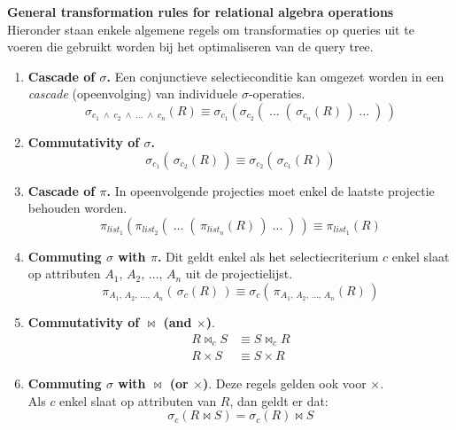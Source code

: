 \noindent \textbf{General transformation rules for relational algebra operations}\\
Hieronder staan enkele algemene regels om transformaties op queries uit te voeren die gebruikt worden bij het optimaliseren van de query tree.
\begin{enumerate}
	\item \textbf{Cascade of $\sigma$.} Een conjunctieve selectieconditie kan omgezet worden in een \textit{cascade} (opeenvolging) van individuele $\sigma$-operaties.
	\vspace{-3mm}
	\[\sigma_{c_1 \;\wedge\; c_2 \;\wedge\; \dots \;\wedge\; c_n}(R) \equiv \sigma_{c_1}  (\sigma_{c_2} (\;\dots\; (\,\sigma_{c_n}(R)\,) \;\dots\;)\,)\]

	\item \textbf{Commutativity of $\sigma$.}
	\vspace{-4mm}
	\[ \sigma_{c_1}  (\,\sigma_{c_2}(R)\,) \equiv \sigma_{c_2}  (\,\sigma_{c_1}(R)\,) \]

	\item \textbf{Cascade of $\pi$.} In opeenvolgende projecties moet enkel de laatste projectie behouden worden.
	\vspace{-3mm}
	\[ \pi_{\textit{list}_1}  (\pi_{\textit{list}_2} (\;\dots\; (\,\pi_{\textit{list}_n}(R)\,) \;\dots\; )\,) \equiv \pi_{\textit{list}_1}(R) \]

	\item \textbf{Commuting $\sigma$ with $\pi$.} Dit geldt enkel als het selectiecriterium $c$ enkel slaat op attributen $A_1,\, A_2,\, \dots,\, A_n$ uit de projectielijst.
	\vspace{-3mm}
	\[ \pi_{A_1,\, A_2,\, \dots,\, A_n}(\,\sigma_{c}(R)\,) \equiv \sigma_c(\,\pi_{A_1,\, A_2,\, \dots,\, A_n}(R)\,) \]

	\item \textbf{Commutativity of $\bowtie$ (and $\times$)}.
	\vspace{-7mm}
	\begin{align*}
		R \bowtie_c S &\equiv S \bowtie_c R \\
		R \times S &\equiv S\times R
	\end{align*}
	
	\item \textbf{Commuting $\sigma$ with $\bowtie$ (or $\times$)}. Deze regels gelden ook voor $\times$.\\
	Als $c$ enkel slaat op attributen van $R$, dan geldt er dat:
	\vspace{-3mm}
	\[ \sigma_c(R \bowtie S) = \sigma_c(R) \bowtie S \]
	

\end{enumerate}
